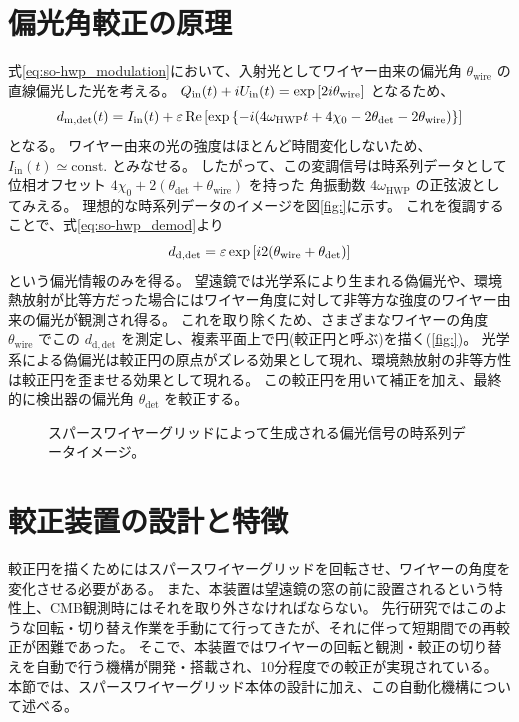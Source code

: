 \documentclass[../../main.tex]{subfiles}
\begin{document}
\section{偏光角較正の原理}
式\eqref{eq:so-hwp_modulation}において、入射光としてワイヤー由来の偏光角 $\theta_{\mathrm{wire}}$ の直線偏光した光を考える。
$Q_{\mathrm{in}}(t) + iU_{\mathrm{in}}(t) = \exp\qty[2i\theta_{\mathrm{wire}}]$ となるため、
\begin{equation}
    d_{\mathrm{m}, \mathrm{det}}(t) = I_{\mathrm{in}}(t) + \varepsilon\Re\qty[\exp\qty{-i \qty(4\omega_{\mathrm{HWP}}t + 4\chi_0 - 2\theta_{\mathrm{det}} - 2\theta_{\mathrm{wire}})}]
\end{equation}
となる。
ワイヤー由来の光の強度はほとんど時間変化しないため、$I_{\mathrm{in}}(t) \simeq \mathrm{const.}$ とみなせる。
したがって、この変調信号は時系列データとして位相オフセット $4\chi_0 + 2(\theta_{\mathrm{det}} + \theta_{\mathrm{wire}})$ を持った
角振動数 $4\omega_{\mathrm{HWP}}$ の正弦波としてみえる。
理想的な時系列データのイメージを図\ref{fig:}に示す。
これを復調することで、式\eqref{eq:so-hwp_demod}より
\begin{equation}
    d_{\mathrm{d, det}} = \varepsilon\exp\qty[i2\qty(\theta_{\mathrm{wire}} + \theta_{\mathrm{det}})]
    \label{eq:wiregrid_mod}
\end{equation}
という偏光情報のみを得る。
望遠鏡では光学系により生まれる偽偏光や、環境熱放射が比等方だった場合にはワイヤー角度に対して非等方な強度のワイヤー由来の偏光が観測され得る。
これを取り除くため、さまざまなワイヤーの角度 $\theta_{\mathrm{wire}}$ でこの $d_{\mathrm{d, det}}$ を測定し、複素平面上で円(較正円と呼ぶ)を描く(\ref{fig:})。
光学系による偽偏光は較正円の原点がズレる効果として現れ、環境熱放射の非等方性は較正円を歪ませる効果として現れる。
この較正円を用いて補正を加え、最終的に検出器の偏光角 $\theta_{\mathrm{det}}$ を較正する。
\begin{figure}[tbp]
    \centering
    \caption[スパースワイヤーグリッドによって生成される偏光信号の時系列データイメージ]{スパースワイヤーグリッドによって生成される偏光信号の時系列データイメージ。}
\end{figure}
\section{較正装置の設計と特徴}
較正円を描くためにはスパースワイヤーグリッドを回転させ、ワイヤーの角度を変化させる必要がある。
また、本装置は望遠鏡の窓の前に設置されるという特性上、CMB観測時にはそれを取り外さなければならない。
先行研究ではこのような回転・切り替え作業を手動にて行ってきたが、それに伴って短期間での再較正が困難であった。
そこで、本装置ではワイヤーの回転と観測・較正の切り替えを自動で行う機構が開発・搭載され、10分程度での較正が実現されている。
本節では、スパースワイヤーグリッド本体の設計に加え、この自動化機構について述べる。
\end{document}
